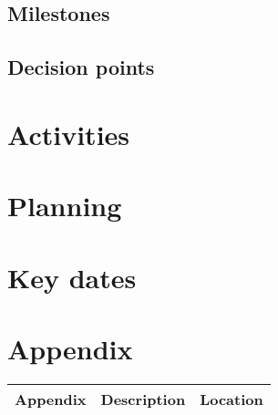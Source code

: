\section{Milestones}\label{chap:milestones}

\section{Decision points}\label{chap:decisionPoints}

\chapter{Activities}\label{chap:activities}

\chapter{Planning}\label{chap:planning}

\chapter{Key dates}\label{chap:keyDates}

\chapter{Appendix}\label{chap:appendix}

\begin{tabular}{|m{}|m{}|m{}|} 
    \hline
    \textbf{Appendix} & \textbf{Description} & \textbf{Location} \\ [0.5ex] \hline
    \hline
\end{tabular}

